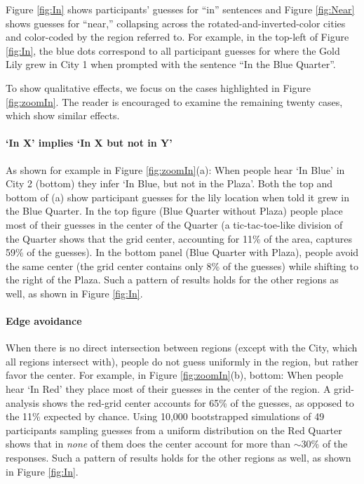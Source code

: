 \documentclass[10pt,letterpaper]{article}
\begin{document}
Figure \ref{fig:In} shows participants' guesses for ``in'' sentences and Figure \ref{fig:Near} shows guesses for ``near,'' collapsing across the rotated-and-inverted-color cities and color-coded by the region referred to. For example, in the top-left of Figure \ref{fig:In}, the blue dots correspond to all participant guesses for where the Gold Lily grew in City 1 when prompted with the sentence ``In the Blue Quarter''. 

To show qualitative effects, we focus on the cases highlighted in Figure \ref{fig:zoomIn}. The reader is encouraged to examine the remaining twenty cases, which show similar effects. 

\paragraph{`In X' implies `In X but not in Y'} As shown for example in Figure \ref{fig:zoomIn}(a): When people hear `In Blue' in City 2 (bottom) they infer `In Blue, but not in the Plaza'. Both the top and bottom of (a) show participant guesses for the lily location when told it grew in the Blue Quarter. In the top figure (Blue Quarter without Plaza) people place most of their guesses in the center of the Quarter (a tic-tac-toe-like division of the Quarter shows that the grid center, accounting for 11\% of the area, captures 59\% of the guesses). In the bottom panel (Blue Quarter with Plaza), people avoid the same center (the grid center contains only 8\% of the guesses) while shifting to the right of the Plaza. Such a pattern of results holds for the other regions as well, as shown in Figure \ref{fig:In}. 

\paragraph{Edge avoidance} When there is no direct intersection between regions (except with the City, which all regions intersect with), people do not guess uniformly in the region, but rather favor the center. For example, in Figure \ref{fig:zoomIn}(b), bottom: When people hear `In Red' they place most of their guesses in the center of the region. A grid-analysis shows the red-grid center accounts for 65\% of the guesses, as opposed to the 11\% expected by chance. Using 10,000 bootstrapped simulations of 49 participants sampling guesses from a uniform distribution on the Red Quarter shows that in \textit{none} of them does the center account for more than $\sim$30\% of the responses. Such a pattern of results holds for the other regions as well, as shown in Figure \ref{fig:In}. 
\end{document}
